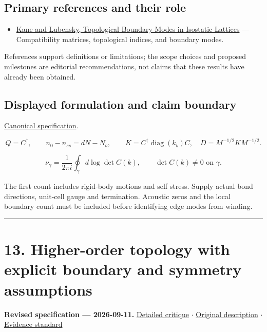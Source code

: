 \documentclass[
  11pt,
]{article}
\providecommand{\tightlist}{%
  \setlength{\itemsep}{0pt}\setlength{\parskip}{0pt}}
\begin{document}
\subsection{Primary references and their role}

\begin{itemize}
\tightlist
\item
  \href{https://arxiv.org/abs/1308.0554}{Kane and Lubensky, Topological
  Boundary Modes in Isostatic Lattices} --- Compatibility matrices,
  topological indices, and boundary modes.
\end{itemize}

References support definitions or limitations; the scope choices and
proposed milestones are editorial recommendations, not claims that these
results have already been obtained.

\subsection{Displayed formulation and claim boundary}

\href{https://github.com/rick-stevens-ai/Pure-Thought/blob/main/PRDs/12-Topological-Mechanical-Metamaterials.md}{Canonical
specification}.

\[Q=C^\dagger,\qquad n_0-n_{ss}=dN-N_b,\qquad
K=C^\dagger\operatorname{diag}(k_b)C,\quad D=M^{-1/2}KM^{-1/2}.\]

\[\nu_\gamma=\frac1{2\pi i}\oint_\gamma d\log\det C(k),
\qquad \det C(k)\ne0\text{ on }\gamma.\]

The first count includes rigid-body motions and self stress. Supply
actual bond directions, unit-cell gauge and termination. Acoustic zeros
and the local boundary count must be included before identifying edge
modes from winding.

\begin{center}\rule{0.5\linewidth}{0.5pt}\end{center}

\section{13. Higher-order topology with explicit boundary and symmetry
assumptions}

\textbf{Revised specification --- 2026-09-11.}
\href{https://github.com/rick-stevens-ai/Pure-Thought/blob/main/reviews/13-Higher-Order-Topological-Insulators.md}{Detailed
critique} \ensuremath{\cdot}
\href{https://github.com/rick-stevens-ai/Pure-Thought/blob/main/archive/original-PRDs/13-Higher-Order-Topological-Insulators.md}{Original
description} \ensuremath{\cdot}
\href{https://github.com/rick-stevens-ai/Pure-Thought/blob/main/reviews/EVIDENCE-STANDARD.md}{Evidence
standard}
\end{document}
